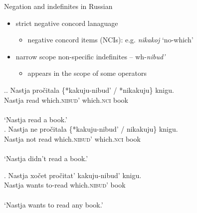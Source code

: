 \documentclass[xcolor=dvipsnames]{beamer}
\begin{document}
\begin{frame}{Negation and indefinites in Russian}
    \begin{scriptsize}
        \cite{Brown1999, Haspelmath2001, Geist2008, Marti2019, Kuhn2021}
    \end{scriptsize}
    \begin{itemize}
        \item strict negative concord lanaguage 
        \begin{itemize}
            \item negative concord items (NCIs): e.g. \textit{nikakoj} `no-which'
        \end{itemize}
        \item narrow scope non-specific indefinites -- wh-\textit{nibud'} 
        \begin{itemize}
            \item appears in the scope of some operators
        \end{itemize}
    \end{itemize}
    \begin{small}
        \ex.\ag. Nastja pročitala \{*kakuju-nibud' / *nikakuju\} knigu. \\
        Nastja read which.\textsc{nibud'}  {} which.\textsc{nci} book \\\\
        `Nastja read a book.' \\  
        \vspace{0.5em}
        \bg. Nastja ne pročitala \{*kakuju-nibud' / nikakuju\} knigu. \\
        Nastja not read which.\textsc{nibud'}  {} which.\textsc{nci} book \\\\
        `Nastja didn't read a book.' \\ 
        \par
        \pause
        \vspace{-0.5em}
        \exg. Nastja xočet pročitat' kakuju-nibud' knigu. \\ 
        Nastja wants to-read  which.\textsc{nibud'} book \\\\
        `Nastja wants to read any book.' \\
        \par
    \end{small}
\end{frame}
\end{document}
